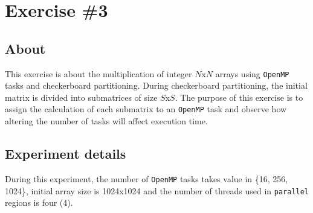 \documentclass{article}
\def\code#1{\texttt{#1}}
\begin{document}
% 



\section{Exercise \#3}

\subsection{About}
This exercise is about the multiplication of integer $N$x$N$ arrays using \texttt{OpenMP} tasks
and checkerboard partitioning. During checkerboard partitioning, the initial matrix is divided
into submatrices of size $S$x$S$. The purpose of this exercise is to assign the calculation
of each submatrix to an \texttt{OpenMP} task and observe how altering the number of tasks
will affect execution time.

\subsection{Experiment details}
During this experiment, the number of \texttt{OpenMP} tasks takes value in \{16, 256, 1024\},
initial array size is 1024x1024 and the number of threads used in \code{parallel} regions is
four (4).
\end{document}
